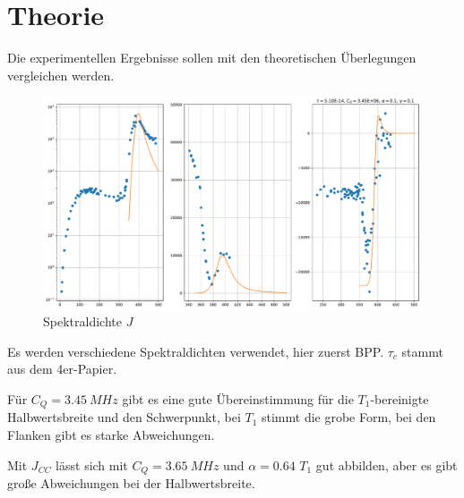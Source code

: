 
















\section{Theorie} \label{section:res:theorie}

Die experimentellen Ergebnisse sollen mit den theoretischen Überlegungen vergleichen werden.

\begin{figure}
	\begin{center}
		\includegraphics[width=\textwidth]{graphics/plots/THEO/J_01.pdf}
	\end{center}
	\caption{Spektraldichte $J$} \label{fig:res:theorie_j}
\end{figure}
Es werden verschiedene Spektraldichten verwendet, hier zuerst BPP. $\tau_c$ stammt aus dem 4er-Papier.

Für $C_Q = \SI{3.45}{MHz}$ gibt es eine gute Übereinstimmung für die $T_1$-bereinigte Halbwertsbreite und den Schwerpunkt, bei $T_1$ stimmt die grobe Form, bei den Flanken gibt es starke Abweichungen.

Mit $J_{CC}$ lässt sich mit $C_Q = \SI{3.65}{MHz}$ und $\alpha = 0.64$ $T_1$ gut abbilden, aber es gibt große Abweichungen bei der Halbwertsbreite. 

